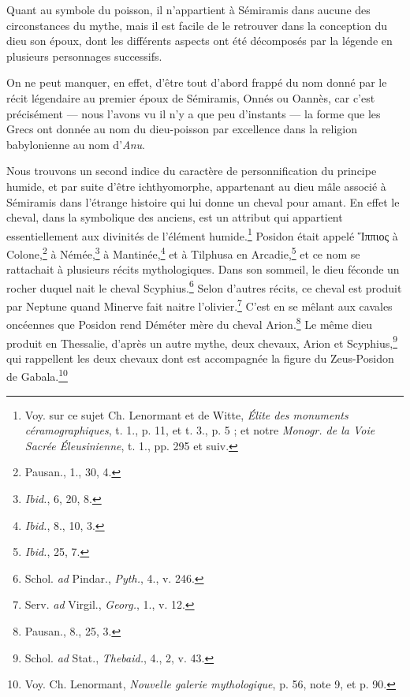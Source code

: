 \documentclass[a4paper, 11pt, oneside, landscape]{article}
\begin{document}
Quant au symbole du poisson, il n'appartient à Sémiramis dans aucune des circonstances du mythe, mais il est facile de le retrouver dans la conception du dieu son époux, dont les différents aspects ont été décomposés par la légende en plusieurs personnages successifs.

On ne peut manquer, en effet, d'être tout d'abord frappé du nom donné par le récit légendaire au premier époux de Sémiramis, Onnés ou Oannès, car c'est précisément --- nous l'avons vu il n'y a que peu d'instants --- la forme que les Grecs ont donnée au nom du dieu-poisson par excellence dans la religion babylonienne au nom d'\emph{Anu}.

Nous trouvons un second indice du caractère de personnification du principe humide, et par suite d'être ichthyomorphe, appartenant au dieu mâle associé à Sémiramis dans l'étrange histoire qui lui donne un cheval pour amant. En effet le cheval, dans la symbolique des anciens, est un attribut qui appartient essentiellement aux divinités de l'élément humide.\footnote{Voy. sur ce sujet Ch. Lenormant et de Witte, \emph{Élite des monuments céramographiques}, t. 1., p. 11, et t. 3., p. 5 ; et notre \emph{Monogr. de la Voie Sacrée Éleusinienne}, t. 1., pp. 295 et suiv.} Posidon était appelé Ἵππιος à Colone,\footnote{Pausan., 1., 30, 4.} à Némée,\footnote{\emph{Ibid.}, 6, 20, 8.} à Mantinée,\footnote{\emph{Ibid.}, 8., 10, 3.} et à Tilphusa en Arcadie,\footnote{\emph{Ibid.}, 25, 7.} et ce nom se rattachait à plusieurs récits mythologiques. Dans son sommeil, le dieu féconde un rocher duquel nait le cheval Scyphius.\footnote{Schol. \emph{ad} Pindar., \emph{Pyth.}, 4., v. 246.} Selon d'autres récits, ce cheval est produit par Neptune quand Minerve fait naitre l'olivier.\footnote{Serv. \emph{ad} Virgil., \emph{Georg.}, 1., v. 12.} C'est en se mêlant aux cavales oncéennes que Posidon rend Déméter mère du cheval Arion.\footnote{Pausan., 8., 25, 3.} Le même dieu produit en Thessalie, d'après un autre mythe, deux chevaux, Arion et Scyphius,\footnote{Schol. \emph{ad} Stat., \emph{Thebaid.}, 4., 2, v. 43.} qui rappellent les deux chevaux dont est accompagnée la figure du Zeus-Posidon de Gabala.\footnote{Voy. Ch. Lenormant, \emph{Nouvelle galerie mythologique}, p. 56, note 9, et p. 90.}
\end{document}
